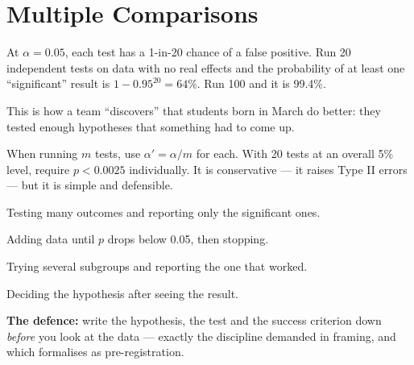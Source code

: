\section{Multiple Comparisons}

\begin{alertbox}
At $\alpha = 0.05$, each test has a 1-in-20 chance of a false positive. Run 20
independent tests on data with no real effects and the probability of at least one
``significant'' result is $1 - 0.95^{20} = 64\%$. Run 100 and it is 99.4\%.

This is how a team ``discovers'' that students born in March do better: they tested
enough hypotheses that something had to come up.
\end{alertbox}

\begin{definitionbox}
When running $m$ tests, use $\alpha' = \alpha / m$ for each. With 20 tests at an
overall 5\% level, require $p < 0.0025$ individually. It is conservative --- it
raises Type II errors --- but it is simple and defensible.
\end{definitionbox}

\begin{pitfall}[$p$-hacking]
\begin{tight}
  \item Testing many outcomes and reporting only the significant ones.
  \item Adding data until $p$ drops below 0.05, then stopping.
  \item Trying several subgroups and reporting the one that worked.
  \item Deciding the hypothesis after seeing the result.
\end{tight}
\textbf{The defence:} write the hypothesis, the test and the success criterion down
\emph{before} you look at the data --- exactly the discipline
 demanded in framing, and which  formalises as
pre-registration.
\end{pitfall}


